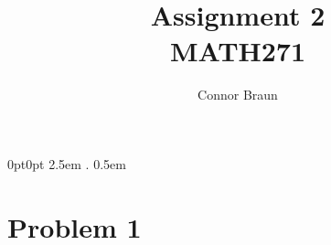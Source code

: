 \documentclass[11pt, letterpaper]{article}
\begin{document}
\title{Assignment 2\\\normalsize MATH271}
\author{Connor Braun}

\allowdisplaybreaks

\theoremstyle{definition}
\newtheorem*{prf}{Proof}
\newtheorem*{sol}{Solution}
\newtheorem{case}{Case}
    {0pt}{0pt}
    {\hangindent 2.5em}
    {}
    {\bfseries}
    {.}
    {0.5em}
    {}
\theoremstyle{mythrm}
\newtheorem{lemma}{Lemma}

\maketitle
\section*{Problem 1}
\end{document}
